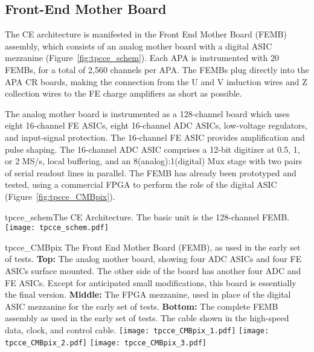 %
\subsection{Front-End Mother Board}
\label{subsec:fe_arch}

The CE architecture is manifested in the Front End Mother Board (FEMB) assembly,
which consists of an analog mother board with a digital ASIC mezzanine (Figure~\ref{fig:tpcce_schem}).
Each APA is instrumented with 20 FEMBs, for a total of 2,560 channels per APA.
The FEMBs plug directly into the APA CR boards, making the connection from the U and V induction wires and 
Z collection wires to the FE charge amplifiers as short as possible.

The analog mother board is instrumented as a 128-channel board which uses eight 16-channel FE ASICs,
eight 16-channel ADC ASICs, low-voltage regulators, and input-signal protection.
The 16-channel FE ASIC provides amplification and pulse shaping.
The 16-channel ADC ASIC comprises a 12-bit digitizer at 0.5, 1, or 2 MS/s, local buffering,
and an 8(analog):1(digital) Mux stage with two pairs of serial readout lines in parallel.
The FEMB has already been prototyped and tested,
using a commercial FPGA to perform the role of the digital ASIC (Figure~\ref{fig:tpcce_CMBpix}).

\begin{cdrfigure}{tpcce_schem}{The CE Architecture. The basic unit is the 128-channel FEMB.}
\texttt{[image: tpcce\_schem.pdf]}
\end{cdrfigure}

\begin{cdrfigure}{tpcce_CMBpix}
{The Front End Mother Board (FEMB), as used in the early set of tests.
  {\bf Top:} The analog mother board, showing four ADC ASICs and four FE ASICs surface mounted.
  The other side of the board has another four ADC and FE ASICs.
  Except for anticipated small modifications, this board is essentially the final version.
  {\bf Middle:} The FPGA mezzanine, used in place of the digital ASIC mezzanine for the early set of tests.
  {\bf Bottom:} The complete FEMB assembly as used in the early set of tests.
  The cable shown in the high-speed data, clock, and control cable.}
\texttt{[image: tpcce\_CMBpix\_1.pdf]}
\texttt{[image: tpcce\_CMBpix\_2.pdf]}
\texttt{[image: tpcce\_CMBpix\_3.pdf]}
\end{cdrfigure}

